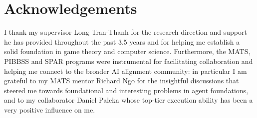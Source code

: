 \chapter{Acknowledgements}

I thank my supervisor Long Tran-Thanh for the research direction and support he has provided throughout the past 3.5 years and for helping me establish a solid foundation in game theory and computer science. Furthermore, the MATS, PIBBSS and SPAR programs were instrumental for facilitating collaboration and helping me connect to the broader AI alignment community: in particular I am grateful to my MATS mentor Richard Ngo for the insightful discussions that steered me towards foundational and interesting problems in agent foundations, and to my collaborator Daniel Paleka whose top-tier execution ability has been a very positive influence on me.%